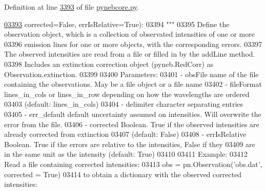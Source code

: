 Definition at line \hyperlink{pynebcore_8py_source_l03393}{3393} of file \hyperlink{pynebcore_8py_source}{pynebcore.\+py}.


\begin{DoxyCode}
\hypertarget{classpyneb_1_1core_1_1pynebcore_1_1_observation_l03393}{}\hyperlink{classpyneb_1_1core_1_1pynebcore_1_1_observation_a4f72b542ac93dd5376e05c7c44015409}{03393}                  corrected=\textcolor{keyword}{False}, errIsRelative=\textcolor{keyword}{True}):
03394         \textcolor{stringliteral}{"""}
03395 \textcolor{stringliteral}{        Define the observation object, which is a collection of observated intensities of one or more}
03396 \textcolor{stringliteral}{        emission lines for one or more objects, with the corresponding errors.}
03397 \textcolor{stringliteral}{        The observed intensities are read from a file or filled in by the addLine method.}
03398 \textcolor{stringliteral}{        Includes an extinction correction object (pyneb.RedCorr) as Observation.extinction.}
03399 \textcolor{stringliteral}{        }
03400 \textcolor{stringliteral}{        Parameters:}
03401 \textcolor{stringliteral}{            - obsFile       name of the file containing the observations. May be a file object or a file
       name }
03402 \textcolor{stringliteral}{            - fileFormat    lines\_in\_cols or lines\_in\_row depending on how the wavelengths are ordered }
03403 \textcolor{stringliteral}{                                (default: lines\_in\_cols)}
03404 \textcolor{stringliteral}{            - delimiter     character separating entries }
03405 \textcolor{stringliteral}{            - err\_default   default uncertainty assumed on intensities. Will overwrite the error from the
       file.}
03406 \textcolor{stringliteral}{            - corrected     Boolean. True if the observed intensities are already corrected from extinction}
03407 \textcolor{stringliteral}{                                (default: False)}
03408 \textcolor{stringliteral}{            - errIsRelative Boolean. True if the errors are relative to the intensities, False if they}
03409 \textcolor{stringliteral}{                                are in the same unit as the intensity (default: True)}
03410 \textcolor{stringliteral}{}
03411 \textcolor{stringliteral}{        Example:}
03412 \textcolor{stringliteral}{            Read a file containing corrected intensities:}
03413 \textcolor{stringliteral}{                obs = pn.Observation('obs.dat', corrected = True)}
03414 \textcolor{stringliteral}{            to obtain a dictionary with the observed  corrected intensities:}

\end{DoxyCode}
